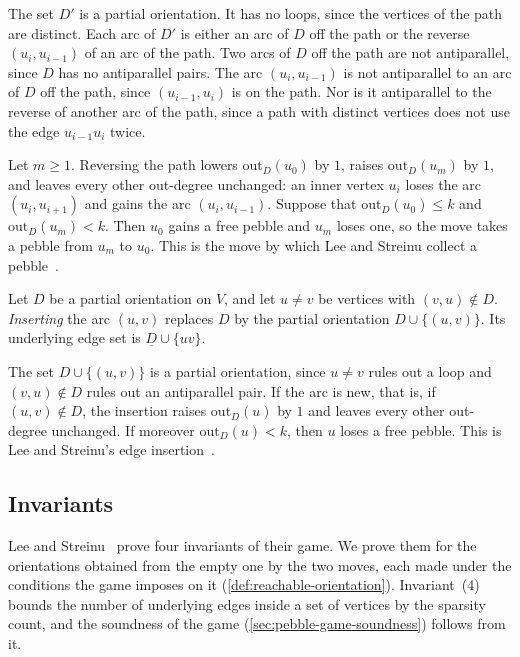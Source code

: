 The set $D'$ is a partial orientation. It has no loops, since the
vertices of the path are distinct. Each arc of $D'$ is either an arc
of $D$ off the path or the reverse $(u_i, u_{i-1})$ of an arc of the
path. Two arcs of $D$ off the path are not antiparallel, since $D$ has
no antiparallel pairs. The arc $(u_i, u_{i-1})$
is not antiparallel to an arc of $D$ off the path, since
$(u_{i-1}, u_i)$ is on the path. Nor is it antiparallel to the reverse
of another arc of the path, since a path with distinct vertices does
not use the edge $u_{i-1} u_i$ twice.

Let $m \ge 1$. Reversing the path lowers $\mathrm{out}_D(u_0)$ by $1$,
raises $\mathrm{out}_D(u_m)$ by $1$, and leaves every other
out-degree unchanged: an inner vertex $u_i$ loses the arc
$(u_i, u_{i+1})$ and gains the arc $(u_i, u_{i-1})$. Suppose that
$\mathrm{out}_D(u_0) \le k$ and $\mathrm{out}_D(u_m) < k$. Then $u_0$
gains a free pebble and $u_m$ loses one, so the move takes a pebble
from $u_m$ to $u_0$. This is the move by which Lee and Streinu collect
a pebble~\cite[\S 3, Fig.~4]{leeStreinu2008}.

\begin{definition}
  \label{def:arc-insertion}
  \leanok
  Let $D$ be a partial orientation on $V$, and let $u \ne v$ be
  vertices with $(v, u) \notin D$. \emph{Inserting} the arc $(u, v)$
  replaces $D$ by the partial orientation $D \cup \{(u, v)\}$. Its
  underlying edge set is $\underline{D} \cup \{uv\}$.
\end{definition}

The set $D \cup \{(u, v)\}$ is a partial orientation, since $u \ne v$
rules out a loop and $(v, u) \notin D$ rules out an antiparallel pair.
If the arc is new, that is, if $(u, v) \notin D$, the insertion raises
$\mathrm{out}_D(u)$ by $1$ and leaves every other out-degree
unchanged. If moreover $\mathrm{out}_D(u) < k$, then $u$ loses a free
pebble. This is Lee and Streinu's edge
insertion~\cite[\S 3, Fig.~4]{leeStreinu2008}.

\subsection{Invariants}
\label{sec:pebble-game-invariants}

Lee and Streinu~\cite[Lemma~10]{leeStreinu2008} prove four invariants
of their game. We prove them for the
orientations obtained from the empty one by the two moves, each made
under the conditions the game imposes on it
(\cref{def:reachable-orientation}). Invariant~(4) bounds the number of
underlying edges inside a set of vertices by the sparsity count, and
the soundness of the game (\cref{sec:pebble-game-soundness}) follows
from it.

